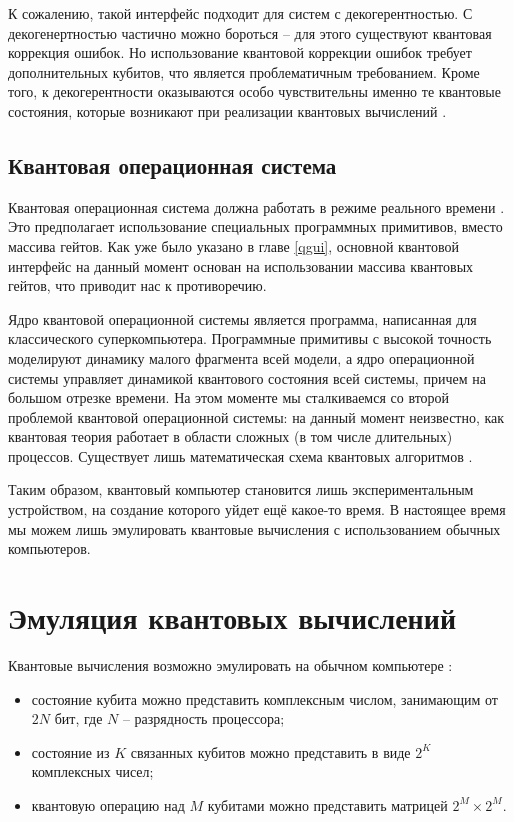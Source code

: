 К сожалению, такой интерфейс подходит для систем с декогерентностью. С декогенертностью частично можно бороться \cite{quantum-codes} -- для этого существуют квантовая коррекция ошибок. Но использование квантовой коррекции ошибок требует дополнительных кубитов, что является проблематичным требованием. Кроме того, к декогерентности оказываются особо чувствительны именно те квантовые состояния, которые возникают при реализации квантовых вычислений \cite{quantum-computer}.

\subsection{Квантовая операционная система}

Квантовая операционная система должна работать в режиме реального времени \cite{quantum-computer}. Это предполагает использование специальных программных примитивов, вместо массива гейтов. Как уже было указано в главе \ref{qgui}, основной квантовой интерфейс на данный момент основан на использовании массива квантовых гейтов, что приводит нас к противоречию. 

Ядро квантовой операционной системы является программа, написанная для классического суперкомпьютера. Программные примитивы с высокой точность моделируют динамику малого фрагмента всей модели, а ядро операционной системы управляет динамикой квантового состояния всей системы, причем на большом отрезке времени. На этом моменте мы сталкиваемся со второй проблемой квантовой операционной системы: на данный момент неизвестно, как квантовая теория работает в области сложных (в том числе длительных) процессов. Существует лишь математическая схема квантовых алгоритмов \cite{quantum-computer}.

Таким образом, квантовый компьютер становится лишь экспериментальным устройством, на создание которого уйдет ещё какое-то время. В настоящее время мы можем лишь эмулировать квантовые вычисления с использованием обычных компьютеров.

\section{Эмуляция квантовых вычислений}\label{emulating}

Квантовые вычисления возможно эмулировать на обычном компьютере \cite{qmemory}:

\begin{itemize}
	\item состояние кубита можно представить комплексным числом, занимающим от $2N$ бит, где $N$ -- разрядность процессора;
	\item состояние из $K$ связанных кубитов можно представить в виде $2^K$ комплексных чисел;
	\item квантовую операцию над $M$ кубитами можно представить матрицей $2^M \times 2^M$.
\end{itemize}

